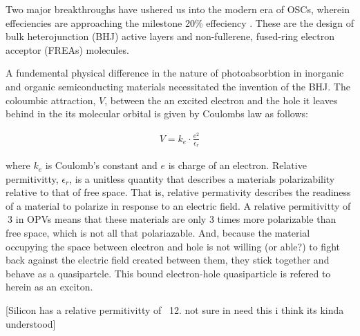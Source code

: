 Two major breakthroughs have ushered us into the modern era of OSCs,
wherein effeciencies are approaching the milestone 20\% effeciency \cite{Liu2020b}.
These are the design of bulk heterojunction (BHJ) active layers and non-fullerene, fused-ring electron
acceptor (FREAs) molecules. 

A fundemental physical difference in the nature of photoabsorbtion in inorganic and organic 
semiconducting materials necessitated the
invention of the BHJ. The coloumbic attraction, $V$, between the an excited
electron and the hole it leaves behind in the its molecular orbital
is given by Coulombs law as follows:

\begin{align}
    \label{coulomb}
    V  =  k_{e} \cdot \frac{e^{2}}{\epsilon_{r}}
\end{align}

where $k_{e}$ is Coulomb's constant and $e$ is charge of an electron. Relative permitivitty,
$\epsilon_{r}$, is a unitless quantity that describes a materials polarizability relative
to that of free space. That is, relative
permativity describes the readiness of a material
to polarize in response to an electric field. A
relative permitivitty of $~3$ in OPVs means that these materials are only $3$ times more polarizable than free space, which
is not all that polariazable. And, because the material occupying the space between electron and hole
is not willing (or able?) to fight back against the electric field created between them, they stick together and behave as a quasipartcle. 
This bound electron-hole quasiparticle is refered to herein as an exciton.

[Silicon has a relative permitivitty of ~12. not sure in need this i think its kinda understood]


